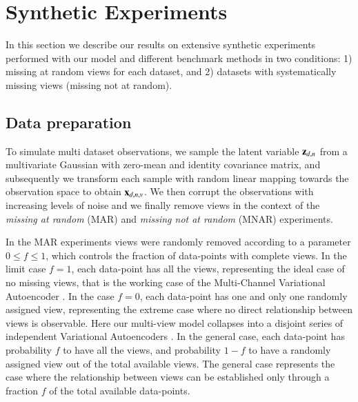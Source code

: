 \section{Synthetic Experiments}
\label{sec:synth}

In this section we describe our results on extensive synthetic experiments performed with our model and different benchmark methods in two conditions:
1) missing at random views for each dataset,
and 2) datasets with systematically missing views (missing not at random).

\subsection{Data preparation}

To simulate multi dataset observations, we sample the latent variable $\mathbf{z}_{d,n}$ from a multivariate Gaussian with zero-mean and identity covariance matrix, and subsequently we transform each sample with random linear mapping towards the observation space to obtain $\mathbf{x}_{d,n,v}$.
We then corrupt the observations with increasing levels of noise
and we finally remove views in the context of the \textit{missing at random} (MAR) and \textit{missing not at random} (MNAR) experiments.

In the MAR experiments views were randomly removed according to a parameter $0 \leq f \leq 1$, which controls the fraction of data-points with complete views.
In the limit case $f=1$, each data-point has all the views, representing the ideal case of no missing views, that is the working case of the Multi-Channel Variational Autoencoder \citep{Antelmi2019}.
In the case $f=0$, each data-point has one and only one randomly assigned view, representing the extreme case where no direct relationship between views is observable.
Here our multi-view model collapses into a disjoint series of independent Variational Autoencoders \citep{Kingma2013, Rezende2014}.
In the general case, each data-point has probability $f$ to have all the views, and probability $1-f$ to have a randomly assigned view out of the total available views.
The general case represents the case where the relationship between views can be established only through a fraction $f$ of the total available data-points.

